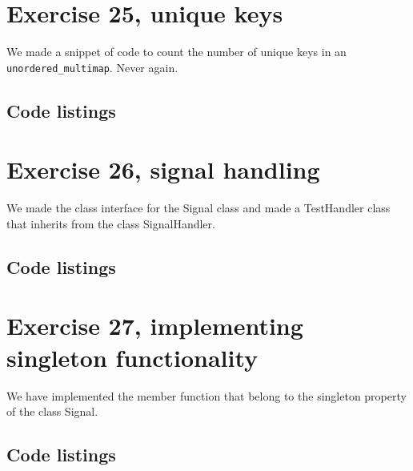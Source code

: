\documentclass[11pt]{article}
\begin{document}
\section*{Exercise 25, unique keys}
We made a snippet of code to count the number of unique keys in an \texttt{unordered\_multimap}.
Never again.

\subsection*{Code listings}


\section*{Exercise 26, signal handling}
We made the class interface for the Signal class and made a TestHandler class that inherits from the class SignalHandler.

\subsection*{Code listings}






 

\section*{Exercise 27, implementing singleton functionality}
We have implemented the member function that belong to the singleton property of the class Signal.

\subsection*{Code listings}


\end{document}
